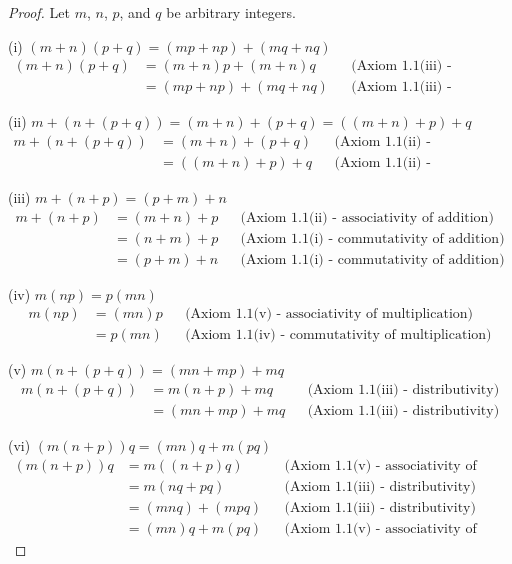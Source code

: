 \begin{proof}
    Let $m$, $n$, $p$, and $q$ be arbitrary integers.

    (i) $(m+n)(p+q) = (mp+np)+(mq+nq)$
    \begin{align*}
        (m+n)(p+q) & = (m+n)p + (m+n)q   &  & \text{(Axiom 1.1(iii) - distributivity)} \\
                   & = (mp+np) + (mq+nq) &  & \text{(Axiom 1.1(iii) - distributivity)}
    \end{align*}

    (ii) $m+(n+(p+q)) = (m+n)+(p+q) = ((m+n)+p)+q$
    \begin{align*}
        m+(n+(p+q)) & = (m+n)+(p+q) &  & \text{(Axiom 1.1(ii) - associativity of addition)} \\
                    & = ((m+n)+p)+q &  & \text{(Axiom 1.1(ii) - associativity of addition)}
    \end{align*}

    (iii) $m+(n+p) = (p+m)+n$
    \begin{align*}
        m+(n+p) & = (m+n)+p &  & \text{(Axiom 1.1(ii) - associativity of addition)} \\
                & = (n+m)+p &  & \text{(Axiom 1.1(i) - commutativity of addition)}  \\
                & = (p+m)+n &  & \text{(Axiom 1.1(i) - commutativity of addition)}
    \end{align*}

    (iv) $m(np) = p(mn)$
    \begin{align*}
        m(np) & = (mn)p &  & \text{(Axiom 1.1(v) - associativity of multiplication)}  \\
              & = p(mn) &  & \text{(Axiom 1.1(iv) - commutativity of multiplication)}
    \end{align*}

    (v) $m(n+(p+q)) = (mn+mp)+mq$
    \begin{align*}
        m(n+(p+q)) & = m(n+p)+mq  &  & \text{(Axiom 1.1(iii) - distributivity)} \\
                   & = (mn+mp)+mq &  & \text{(Axiom 1.1(iii) - distributivity)}
    \end{align*}

    (vi) $(m(n+p))q = (mn)q+m(pq)$
    \begin{align*}
        (m(n+p))q & = m((n+p)q)   &  & \text{(Axiom 1.1(v) - associativity of multiplication)} \\
                  & = m(nq+pq)    &  & \text{(Axiom 1.1(iii) - distributivity)}                \\
                  & = (mnq)+(mpq) &  & \text{(Axiom 1.1(iii) - distributivity)}                \\
                  & = (mn)q+m(pq) &  & \text{(Axiom 1.1(v) - associativity of multiplication)}
    \end{align*}
\end{proof}

